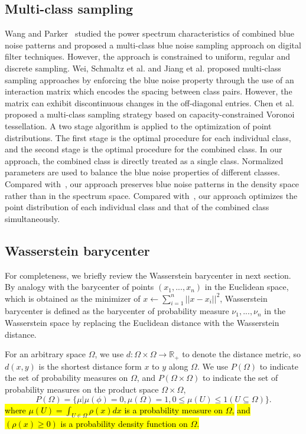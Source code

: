 \subsection{Multi-class sampling}
Wang and Parker~ studied the power spectrum characteristics of combined blue noise patterns and proposed a multi-class blue noise sampling approach on digital filter techniques.
However, the approach is constrained to uniform, regular and discrete sampling.
Wei, Schmaltz et al. and Jiang et al. proposed multi-class sampling
approaches by enforcing the blue noise property through the use of an interaction matrix which
encodes the spacing between class pairs.
However, the matrix can exhibit discontinuous changes in the off-diagonal entries.
Chen et al.~ proposed a multi-class sampling strategy based on capacity-constrained Voronoi tessellation.
A two stage algorithm
 is applied to the optimization of point distributions.
The first stage is the optimal procedure for each individual class,
and the second stage is the optimal procedure for the combined class.
In our approach,
the combined class is directly treated as a single class.
Normalized parameters are used to balance the blue noise properties of different classes.
Compared with~\cite{Wang:1999:BlueNoise},
our approach preserves blue noise patterns in the density space rather than in the spectrum space.
Compared with~\cite{chen:2012:variational},
our approach optimizes the point distribution of each individual class and that of the combined class simultaneously.


\subsection{Wasserstein barycenter}
For completeness, we briefly review the Wasserstein barycenter in  next section.
By analogy with the barycenter of points $(x_1,...,x_n)$ in the Euclidean space, which is obtained as the minimizer of $x\leftarrow\sum_{i=1}^n||x-x_i||^2$,
Wasserstein barycenter is defined as the barycenter of probability measure $\nu_1,...,\nu_n$ in the Wasserstein space
by replacing the Euclidean distance with the Wasserstein distance.

For an arbitrary space $\Omega$,
we use $d:\Omega\times\Omega\rightarrow{\mathbb{R}}_+$ to denote the distance metric,
so $d(x,y)$ is the shortest distance form $x$ to $y$ along $\Omega$.
We use $P(\Omega)$ to indicate the set of probability measures on $\Omega$,
and $P(\Omega\times\Omega)$ to indicate the set of probability measures on the product space $\Omega\times\Omega$,
\begin{equation*}
 P(\Omega)=\{\mu|\mu(\phi)=0,\mu(\Omega)=1, 0\leq\mu(U)\leq 1 (U\subseteq\Omega)\}.
\end{equation*}
\hl{where $\mu(U)=\int_{U\in\Omega}\rho(x)dx$ is a probability measure on $\Omega$,}  
\hl{and $(\rho(x)\geq0)$ is a probability density function on $\Omega$.}

